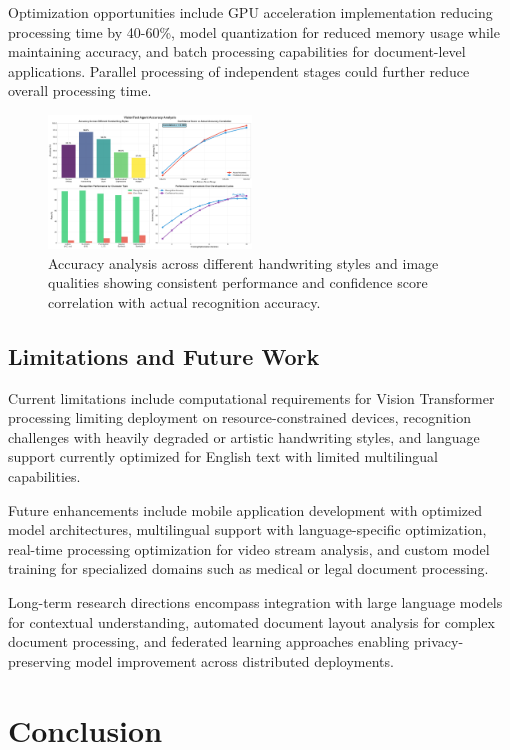 \documentclass[10pt,twocolumn]{article}
\begin{document}
Optimization opportunities include GPU acceleration implementation reducing processing time by 40-60\%, model quantization for reduced memory usage while maintaining accuracy, and batch processing capabilities for document-level applications. Parallel processing of independent stages could further reduce overall processing time.

\begin{figure}[!htb]
\centering
\includegraphics[width=0.48\textwidth]{accuracy_analysis.png}
\caption{Accuracy analysis across different handwriting styles and image qualities showing consistent performance and confidence score correlation with actual recognition accuracy.}
\label{fig:accuracy}
\end{figure}

\subsection{Limitations and Future Work}

Current limitations include computational requirements for Vision Transformer processing limiting deployment on resource-constrained devices, recognition challenges with heavily degraded or artistic handwriting styles, and language support currently optimized for English text with limited multilingual capabilities.

Future enhancements include mobile application development with optimized model architectures, multilingual support with language-specific optimization, real-time processing optimization for video stream analysis, and custom model training for specialized domains such as medical or legal document processing.

Long-term research directions encompass integration with large language models for contextual understanding, automated document layout analysis for complex document processing, and federated learning approaches enabling privacy-preserving model improvement across distributed deployments.

\section{\large Conclusion}
\end{document}
